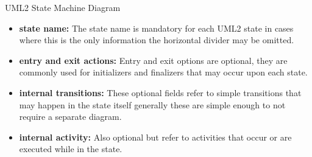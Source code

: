 \begin{definition}
UML2 State Machine Diagram

\label{def:uml2}
\begin{itemize}
	\item \textbf{state name:} The state name is mandatory for each UML2 state in cases where this is the only information the horizontal divider may be omitted.
	\item \textbf{entry and exit actions:} Entry and exit options are optional, they are commonly used for initializers and finalizers that may occur upon each state.
	\item \textbf{internal transitions:} These optional fields refer to simple transitions that may happen in the state itself generally these are simple enough to not require a separate diagram.
	\item \textbf{internal activity:} Also optional but refer to activities that occur or are executed while in the state.
\end{itemize}
\end{definition}


